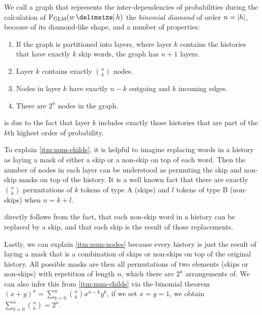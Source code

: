 We call a graph that represents the inter-dependencies of probabilities during
the calculation of $\ProbGLM{w}{h}$ the \emph{binomial diamond} of order
$n = {\left|h\right|}$, because of its diamond-like shape, and a number of
properties:

\begin{enumerate}
  \item \label{itm:num-layers} If the graph is partitioned into layers, where
    layer $k$ contains the histories that have exactly $k$ skip words, the graph
    has $n + 1$ layers.
  \item \label{itm:num-childs} Layer $k$ contains exactly $\binom{n}{k}$ nodes.
  \item \label{itm:num-edges}  Nodes in layer $k$ have exactly $n - k$ outgoing
    and $k$ incoming edges.
  \item \label{itm:num-nodes}  There are $2^n$ nodes in the graph.
\end{enumerate}

 is due to the fact that layer $k$ includes exactly those
histories that are part of the $k$th highest order of probability.

To explain \cref{itm:num-childs}, it is helpful to imagine replacing words in
a history as laying a mask of either a skip or a non-skip on top of each word.
Then the number of nodes in each layer can be understood as permuting the
skip and non-skip masks on top of the history.
It is a well known fact that there are exactly $\binom{n}{k}$ permutations of
$k$ tokens of type A (skips) and $l$ tokens of type B (non-skips) when
$n = k + l$.

 directly follows from the fact, that each non-skip word
in a history can be replaced by a skip, and that each skip is the result
of those replacements.

Lastly, we can explain \cref{itm:num-nodes} because every history is just the
result of laying a mask that is a combination of skips or non-skips on top of
the original history.
All possible masks are then all permutations of two elements (skips or
non-skips) with repetition of length $n$, which there are $2^n$ arrangements of.
We can also infer this from \cref{itm:num-childs} via the binomial theorem
$(x+ y)^n = \sum_{k=0}^n \binom{n}{k} x^{n-k} y^k$, if we set ${x = y = 1}$,
we obtain $\sum_{k=0}^n \binom{n}{k} = 2^n$.

